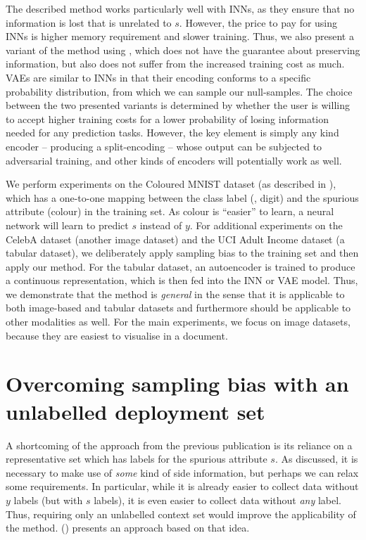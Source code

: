 The described method works particularly well with \acp{INN},
as they ensure that no information is lost that is unrelated to \(s\).
However, the price to pay for using \acp{INN} is higher memory requirement and slower training.
Thus, we also present a variant of the method using ,
which does not have the guarantee about preserving information,
but also does not suffer from the increased training cost as much.
\acp{VAE} are similar to \acp{INN}
in that their encoding conforms to a specific probability distribution,
from which we can sample our null-samples.
The choice between the two presented variants is determined
by whether the user is willing to accept higher training costs
for a lower probability of losing information needed for any prediction tasks.
However, the key element is simply any kind encoder -- producing a split-encoding --
whose output can be subjected to adversarial training,
and other kinds of encoders will potentially work as well.

We perform experiments on the Coloured MNIST dataset (as described in ),
which has a one-to-one mapping between the class label (\ie, digit) and the spurious attribute (colour)
in the training set.
As colour is ``easier'' to learn, a neural network will learn to predict \(s\) instead of \(y\).
For additional experiments on the CelebA dataset (another image dataset)
and the UCI Adult Income dataset (a tabular dataset),
we deliberately apply sampling bias to the training set and then apply our method.
For the tabular dataset, an autoencoder is trained to produce a continuous representation,
which is then fed into the \ac{INN} or \ac{VAE} model.
Thus, we demonstrate that the method is \emph{general}
in the sense that it is applicable to both image-based and tabular datasets
and furthermore should be applicable to other modalities as well.
For the main experiments, we focus on image datasets,
because they are easiest to visualise in a document.

\section{Overcoming sampling bias with an unlabelled deployment set}\label{sec:zsf}
A shortcoming of the approach from the previous publication \citep{kehrenberg2020nullsampling}
is its reliance on a representative set which has labels for the spurious attribute \(s\).
As discussed, it is necessary to make use of \emph{some} kind of side information,
but perhaps we can relax some requirements.
In particular, while it is already easier to collect data without \(y\) labels (but with \(s\) labels),
it is even easier to collect data without \emph{any} label.
Thus, requiring only an unlabelled context set would improve the applicability of the method.
\citet{kehrenberg2020zeroshot} () presents an approach based on that idea.

